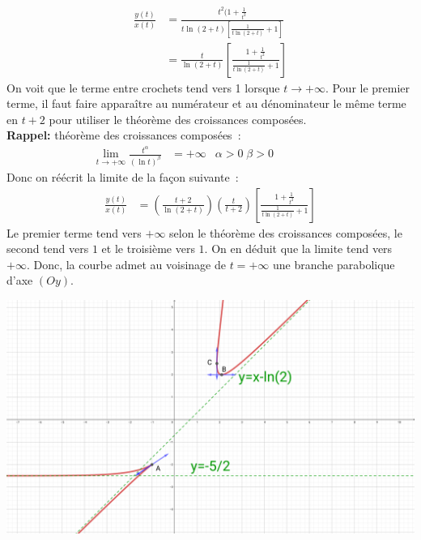 \documentclass{article}
\begin{document}
\begin{itemize}
\begin{align*}
        \frac{y(t)}{x(t)} &= \frac{t^2(1+\frac{1}{t^2}}{t\ln(2+t)\left[\frac{1}{t\ln(2+t)}+1\right]} \\
                          &= \frac{t}{\ln(2+t)}\left[\frac{1+\frac{1}{t^2}}{\frac{1}{t\ln(2+t)}+1}\right]
\end{align*}
On voit que le terme entre crochets tend vers 1 lorsque $t\to +\infty$.
Pour le premier terme, il faut faire apparaître au numérateur et au dénominateur
                le même terme en $t+2$ pour utiliser le théorème des croissances composées.\\
                \textbf{Rappel:} théorème des croissances composées~:\\
\begin{align*}
        \lim_{t\to +\infty}\frac{t^\alpha}{\left(\ln t\right)^\beta}&=+\infty & \alpha>0\;\beta>0 & &  & & & & 
\end{align*}
Donc on réécrit la limite de la façon suivante~:
\begin{align*}
        \frac{y(t)}{x(t)} &= \left(\frac{t+2}{\ln(2+t)}\right)
                             \left(\frac{t}{t+2}\right)
                             \left[\frac{1+\frac{1}{t^2}}{\frac{1}{t\ln(2+t)}+1}\right]
\end{align*}
Le premier terme tend vers $+\infty$ selon le théorème des croissances composées, le second
tend vers $1$ et le troisième vers $1$.
On en déduit que la limite tend vers $+\infty$.
                Donc, la courbe admet au voisinage de $t=+\infty$ une branche parabolique d'axe $(Oy)$.
\end{itemize}

\includegraphics[width=\textwidth]{images/exercice3.png}
\end{document}
